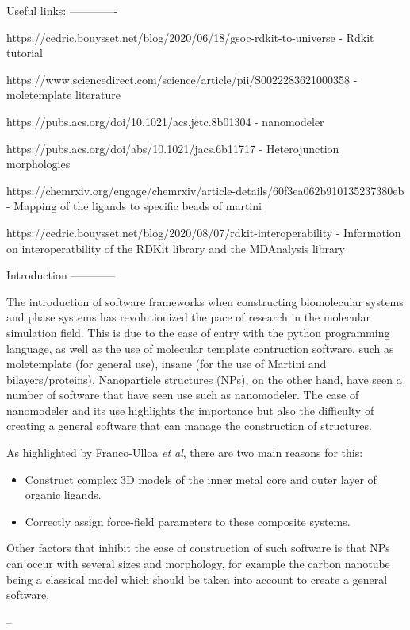 Useful links:
-------------

https://cedric.bouysset.net/blog/2020/06/18/gsoc-rdkit-to-universe - Rdkit tutorial

https://www.sciencedirect.com/science/article/pii/S0022283621000358 - moletemplate literature

https://pubs.acs.org/doi/10.1021/acs.jctc.8b01304 - nanomodeler

https://pubs.acs.org/doi/abs/10.1021/jacs.6b11717 - Heterojunction morphologies 

https://chemrxiv.org/engage/chemrxiv/article-details/60f3ea062b910135237380eb - Mapping of the ligands to specific beads of martini

https://cedric.bouysset.net/blog/2020/08/07/rdkit-interoperability - Information on interoperatbility of the RDKit library and the MDAnalysis library

Introduction
------------

The introduction of software frameworks when constructing biomolecular systems and phase systems has revolutionized the pace of research in the
molecular simulation field. This is due to the ease of entry with the python programming language, as well as the use of molecular template contruction software,
such as moletemplate (for general use), insane (for the use of Martini and bilayers/proteins). Nanoparticle structures (NPs), on the other hand, have seen a number of software that
have seen use such as nanomodeler. The case of nanomodeler and its use highlights the importance but also the difficulty of creating a general software that can manage the
construction of structures.

As highlighted by Franco-Ulloa \emph{et al}, there are two main reasons for this:
\begin{itemize}
\item Construct complex 3D models of the inner metal core and outer layer of organic ligands.
\item Correctly assign force-field parameters to these composite systems.
\end{itemize} 
Other factors that inhibit the ease of construction of such software is that NPs can occur with several sizes and morphology, for example the carbon nanotube being a classical
model which should be taken into account to create a general software. 

--

